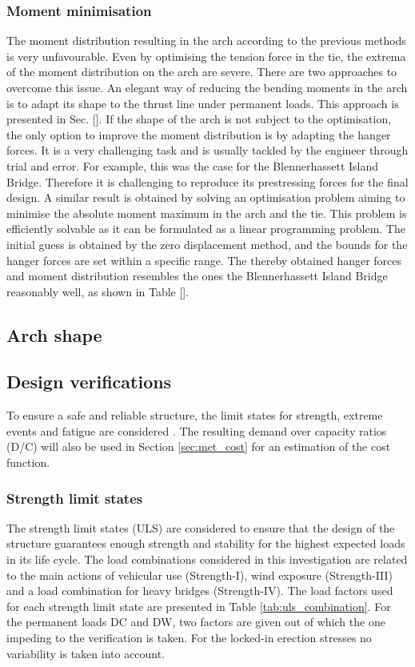 \subsubsection{Moment minimisation}
The moment distribution resulting in the arch according to the previous methods is very unfavourable. Even by optimising the tension force in the tie, the extrema of the moment distribution on the arch are severe. There are two approaches to overcome this issue. An elegant way of reducing the bending moments in the arch is to adapt its shape to the thrust line under permanent loads. This approach is presented in Sec. []. If the shape of the arch is not subject to the optimisation, the only option to improve the moment distribution is by adapting the hanger forces. It is a very challenging task and is usually tackled by the engineer through trial and error. For example, this was the case for the Blennerhassett Island Bridge. Therefore it is challenging to reproduce its prestressing forces for the final design. A similar result is obtained by solving an optimisation problem aiming to minimise the absolute moment maximum in the arch and the tie. This problem is efficiently solvable as it can be formulated as a linear programming problem. The initial guess is obtained by the zero displacement method, and the bounds for the hanger forces are set within a specific range.  The thereby obtained hanger forces and moment distribution resembles the ones the Blennerhassett Island Bridge reasonably well, as shown in Table [].

\subsection{Arch shape} \label{sec:met_arch}

\newpage
\subsection{Design verifications} \label{sec:met_ver}
To ensure a safe and reliable structure, the limit states for strength, extreme events and fatigue are considered \citep{AASHTO}.  The resulting demand over capacity ratios (D/C) will also be used in Section \ref{sec:met_cost} for an estimation of the cost function.

\subsubsection{Strength limit states}
The strength limit states (ULS) are considered to ensure that the design of the structure guarantees enough strength and stability for the highest expected loads in its life cycle. The load combinations considered in this investigation are related to the main actions of vehicular use (Strength-I), wind exposure (Strength-III) and a load combination for heavy bridges (Strength-IV). The load factors used for each strength limit state are presented in Table \ref{tab:uls_combination}. For the permanent loads DC and DW, two factors are given out of which the one impeding to the verification is taken. For the locked-in erection stresses no variability is taken into account.

